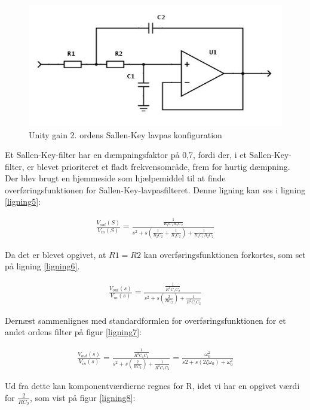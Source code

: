 \begin{figure}[H]
	\centering
	\includegraphics[width=1\textwidth]{Figurer/Hardware/FilterDesign}
	\caption{Unity gain 2. ordens Sallen-Key lavpas konfiguration}
	\label{fig:Filter}
\end{figure}

Et Sallen-Key-filter har en dæmpningsfaktor på 0,7, fordi der, i et Sallen-Key-filter, er blevet prioriteret et fladt frekvensområde, frem for hurtig dæmpning. Der blev brugt en hjemmeside som hjælpemiddel til at finde overføringsfunktionen for Sallen-Key-lavpasfilteret.\cite{Overforing} Denne ligning kan ses i ligning \ref{ligning5}:


\begin{align}
	\frac{V_{out}(S)}{V_{in}(S)}=\frac{\frac{1}{R_1C_1R_2C_2}}{s^2+s(\frac{1}{R_2C_2}+\frac{1}{R_1C_2})+\frac{1}{R_1C_1R_2C_2}}
	\label{ligning5}
\end{align}

Da det er blevet opgivet, at $R1=R2$ kan overføringsfunktionen forkortes, som set på ligning \ref{ligning6}.

\begin{align}
\frac{V_{out}(s)}{V_{in}(s)}=\frac{\frac{1}{R^2C_{1}C_{2}}}{s^2+s(\frac{2}{RC_{2}})+\frac{1}{R^2C_{1}C_{2}}}
\label{ligning6}
\end{align}

Dernæst sammenlignes med standardformlen for overføringsfunktionen for et andet ordens filter på figur \ref{ligning7}:

\begin{align}
\frac{V_{out}(s)}{V_{in}(s)} = \frac{\frac{1}{R^{2}C_{1} C_{2}}}{s^2+s(\frac{2}{RC_{2}})+\frac{1}{R^{2}C_{1}C_{2}}} = \frac{\omega_{0}^{2}}{s{2}+s(2\zeta\omega_{0})+\omega_{0}^{2}}
\label{ligning7}
\end{align}

Ud fra dette kan komponentværdierne regnes for R, idet vi har en opgivet værdi for $\frac{2}{RC_{2}}$, som vist på figur \ref{ligning8}:


